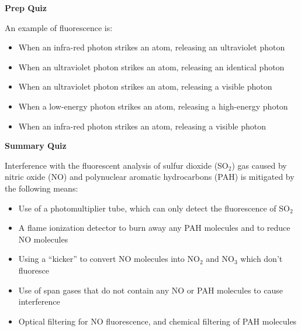 \noindent
{\bf Prep Quiz}

An example of fluorescence is:

\begin{itemize}
\item{} When an infra-red photon strikes an atom, releasing an ultraviolet photon
\vskip 5pt
\item{} When an ultraviolet photon strikes an atom, releasing an identical photon
\vskip 5pt
\item{} When an ultraviolet photon strikes an atom, releasing a visible photon
\vskip 5pt
\item{} When a low-energy photon strikes an atom, releasing a high-energy photon
\vskip 5pt
\item{} When an infra-red photon strikes an atom, releasing a visible photon
\end{itemize}





\vfil \eject

\noindent
{\bf Summary Quiz}

Interference with the fluorescent analysis of sulfur dioxide (SO$_{2}$) gas caused by nitric oxide (NO) and polynuclear aromatic hydrocarbons (PAH) is mitigated by the following means:

\begin{itemize}
\item{} Use of a photomultiplier tube, which can only detect the fluorescence of SO$_{2}$
\vskip 5pt
\item{} A flame ionization detector to burn away any PAH molecules and to reduce NO molecules
\vskip 5pt
\item{} Using a ``kicker'' to convert NO molecules into NO$_{2}$ and NO$_{3}$ which don't fluoresce
\vskip 5pt
\item{} Use of span gases that do not contain any NO or PAH molecules to cause interference
\vskip 5pt
\item{} Optical filtering for NO fluorescence, and chemical filtering of PAH molecules
\end{itemize}





